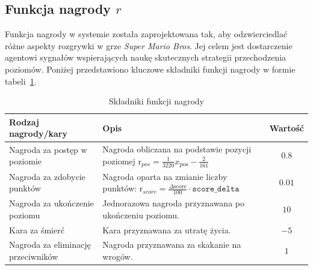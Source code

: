 \subsection{Funkcja nagrody $r$}

Funkcja nagrody w systemie została zaprojektowana tak, aby odzwierciedlać różne aspekty rozgrywki w grze \textit{Super Mario Bros}. Jej celem jest dostarczenie agentowi sygnałów wspierających naukę skutecznych strategii przechodzenia poziomów. Poniżej przedstawiono kluczowe składniki funkcji nagrody w formie tabeli~\ref{tab:reward_function}.

\begin{table}[h!]
	\centering
	\caption{Składniki funkcji nagrody}
	\label{tab:reward_function}
	\begin{tabular}{|p{4.8cm}|p{7.8cm}|c|}
		\hline
		\textbf{Rodzaj nagrody/kary}                                                       & \textbf{Opis} & \textbf{Wartość} \\ \hline
		Nagroda za postęp w poziomie                                                       &
		Nagroda obliczana na podstawie pozycji poziomej
		\(\text{r}_{pos} = \frac{1}{3220} x_{\text{pos}} - \frac{2}{161}\)                 &
		\(0.8\)                                                                                                               \\ \hline
		Nagroda za zdobycie punktów                                                        &
		Nagroda oparta na zmianie liczby punktów: \newline
		\(\text{r}_{score} = \frac{\Delta \text{score}}{100} \cdot \texttt{score\_delta}\) &
		\(0.01\)                                                                                                              \\ \hline
		Nagroda za ukończenie poziomu                                                      &
		Jednorazowa nagroda przyznawana po ukończeniu poziomu.                             &
		\(10\)                                                                                                                \\ \hline
		Kara za śmierć                                                                     &
		Kara przyznawana za utratę życia.                                                  &
		\(-5\)                                                                                                                \\ \hline
		Nagroda za eliminację przeciwników                                                 &
		Nagroda przyznawana za skakanie na wrogów.                                         &
		\(1\)                                                                                                                 \\ \hline
	\end{tabular}
\end{table}

